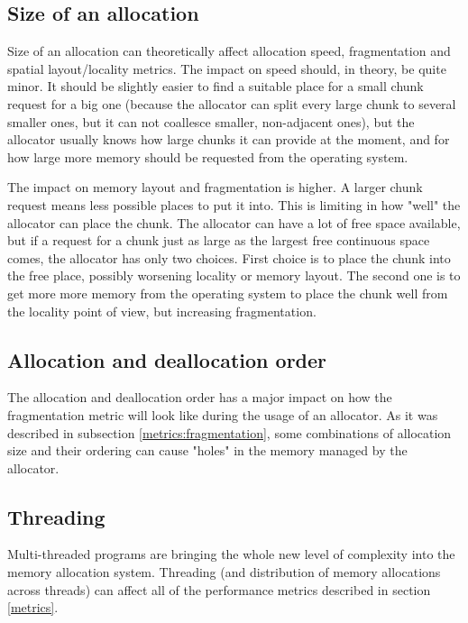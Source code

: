 \subsection{Size of an allocation}

Size of an allocation can theoretically affect allocation speed, fragmentation and spatial layout/locality metrics. The impact on speed should, in theory, be quite minor. It should be slightly easier to find a suitable place for a small chunk request for a big one (because the allocator can split every large chunk to several smaller ones, but it can not coallesce smaller, non-adjacent ones), but the allocator usually knows how large chunks it can provide at the moment, and for how large more memory should be requested from the operating system.

The impact on memory layout and fragmentation is higher. A larger chunk request means less possible places to put it into. This is limiting in how "well" the allocator can place the chunk. The allocator can have a lot of free space available, but if a request for a chunk just as large as the largest free continuous space comes, the allocator has only two choices. First choice is to place the chunk into the free place, possibly worsening locality or memory layout. The second one is to get more more memory from the operating system to place the chunk well from the locality point of view, but increasing fragmentation.

\subsection{Allocation and deallocation order}

The allocation and deallocation order has a major impact on how the fragmentation metric will look like during the usage of an allocator. As it was described in subsection \ref{metrics:fragmentation}, some combinations of allocation size and their ordering can cause "holes" in the memory managed by the allocator.

\subsection{Threading}

Multi-threaded programs are bringing the whole new level of complexity into the memory allocation system. Threading (and distribution of memory allocations across threads) can affect all of the performance metrics described in section \ref{metrics}. 

